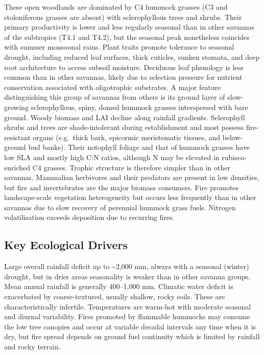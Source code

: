 \documentclass[
  letterpaper,
  DIV=11,
  numbers=noendperiod]{scrartcl}
\begin{document}
These open woodlands are dominated by C4 hummock grasses (C3 and
stoloniferous grasses are absent) with sclerophyllous trees and shrubs.
Their primary productivity is lower and less regularly seasonal than in
other savannas of the subtropics (T4.1 and T4.2), but the seasonal peak
nonetheless coincides with summer monsoonal rains. Plant traits promote
tolerance to seasonal drought, including reduced leaf surfaces, thick
cuticles, sunken stomata, and deep root architecture to access subsoil
moisture. Deciduous leaf phenology is less common than in other
savannas, likely due to selection pressure for nutrient conservation
associated with oligotrophic substrates. A major feature distinguishing
this group of savannas from others is its ground layer of slow-growing
sclerophyllous, spiny, domed hummock grasses interspersed with bare
ground. Woody biomass and LAI decline along rainfall gradients.
Sclerophyll shrubs and trees are shade-intolerant during establishment
and most possess fire-resistant organs (e.g.~thick bark, epicormic
meristematic tissues, and below-ground bud banks). Their notophyll
foliage and that of hummock grasses have low SLA and mostly high C:N
ratios, although N may be elevated in rubisco-enriched C4 grasses.
Trophic structure is therefore simpler than in other savannas. Mammalian
herbivores and their predators are present in low densities, but fire
and invertebrates are the major biomass consumers. Fire promotes
landscape-scale vegetation heterogeneity but occurs less frequently than
in other savannas due to slow recovery of perennial hummock grass fuels.
Nitrogen volatilisation exceeds deposition due to recurring fires.

\subsection{Key Ecological Drivers}\label{key-ecological-drivers-85}

Large overall rainfall deficit up to \textasciitilde2,000 mm, always
with a seasonal (winter) drought, but in drier areas seasonality is
weaker than in other savanna groups. Mean annual rainfall is generally
400--1,000 mm. Climatic water deficit is exacerbated by coarse-textured,
usually shallow, rocky soils. These are characteristically infertile.
Temperatures are warm-hot with moderate seasonal and diurnal
variability. Fires promoted by flammable hummocks may consume the low
tree canopies and occur at variable decadal intervals any time when it
is dry, but fire spread depends on ground fuel continuity which is
limited by rainfall and rocky terrain.
\end{document}
